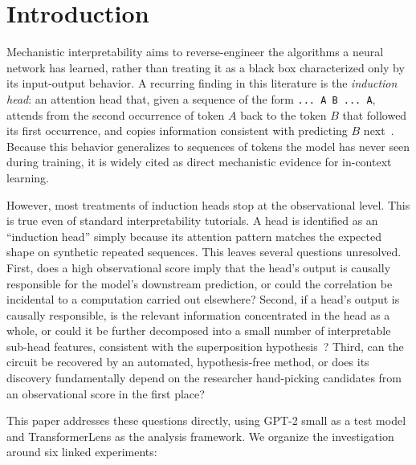 \documentclass[conference]{IEEEtran}
\begin{document}
\section{Introduction}

Mechanistic interpretability aims to reverse-engineer the algorithms a neural network has learned, rather than treating it as a black box characterized only by its input-output behavior. A recurring finding in this literature is the \emph{induction head}: an attention head that, given a sequence of the form \texttt{... A B ... A}, attends from the second occurrence of token $A$ back to the token $B$ that followed its first occurrence, and copies information consistent with predicting $B$ next~\cite{olsson2022}. Because this behavior generalizes to sequences of tokens the model has never seen during training, it is widely cited as direct mechanistic evidence for in-context learning.

However, most treatments of induction heads stop at the observational level. This is true even of standard interpretability tutorials. A head is identified as an ``induction head'' simply because its attention pattern matches the expected shape on synthetic repeated sequences. This leaves several questions unresolved. First, does a high observational score imply that the head's output is causally responsible for the model's downstream prediction, or could the correlation be incidental to a computation carried out elsewhere? Second, if a head's output is causally responsible, is the relevant information concentrated in the head as a whole, or could it be further decomposed into a small number of interpretable sub-head features, consistent with the superposition hypothesis~\cite{bricken2023}? Third, can the circuit be recovered by an automated, hypothesis-free method, or does its discovery fundamentally depend on the researcher hand-picking candidates from an observational score in the first place?

This paper addresses these questions directly, using GPT-2 small as a test model and TransformerLens as the analysis framework. We organize the investigation around six linked experiments:
\end{document}
